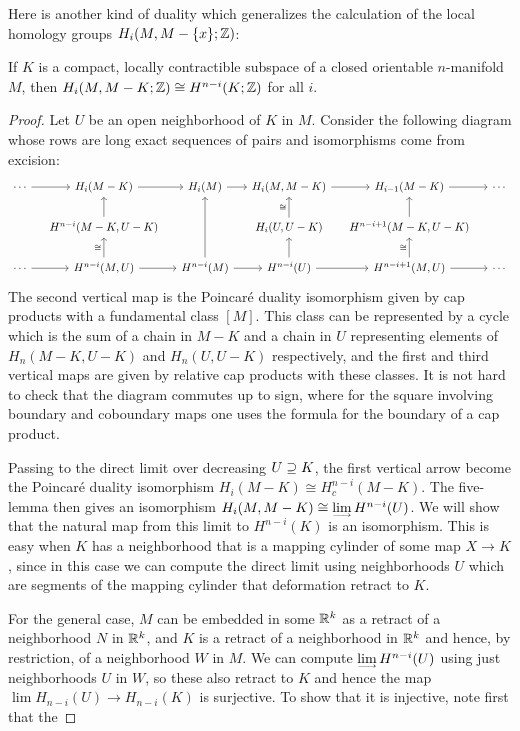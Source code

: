 Here is another kind of duality which generalizes the calculation of the local homology groups $H_i(M,M-\{x\};\mathbb{Z})$:
\begin{theorem}\label{loc contract dual}
If $K$ is a compact, locally contractible subspace of a closed orientable $n$-manifold $M$, then $H_i(M,M-K;\mathbb{Z})\cong H^{n-i}(K;\mathbb{Z})$ for all $i$.
\end{theorem}
\begin{proof}
Let $U$ be an open neighborhood of $K$ in $M$. Consider the following diagram whose rows are long exact sequences of pairs and isomorphisms come from excision:
\[\begin{tikzcd}[column sep=small]
\cdots\ar[r]&H_i(M-K)\ar[r]&H_i(M)\ar[r]&H_i(M,M-K)\ar[r]&H_{i-1}(M-K)\ar[r]&\cdots\\
&H^{n-i}(M-K,U-K)\ar[u]&&H_i(U,U-K)\ar[u,"\cong"]&H^{n-i+1}(M-K,U-K)\ar[u]&\\
\cdots\ar[r]&H^{n-i}(M,U)\ar[u,"\cong"]\ar[r]&H^{n-i}(M)\ar[uu]\ar[r]&H^{n-i}(U)\ar[r]\ar[u]&H^{n-i+1}(M,U)\ar[r]\ar[u,"\cong"]&\cdots
\end{tikzcd}\]
The second vertical map is the Poincar\'e duality isomorphism given by cap products with a fundamental class $[M]$. This class can be represented by a cycle which is the sum of a chain in $M-K$ and a chain in $U$ representing elements of $H_n(M-K,U-K)$ and $H_n(U,U-K)$ respectively, and the first and third vertical maps are given by relative cap products with these classes. It is not hard to check that the diagram commutes up to sign, where for the square involving boundary and coboundary maps one uses the formula for the boundary of a cap product.\par
Passing to the direct limit over decreasing $U\supseteq K$, the first vertical arrow become the Poincar\'e duality isomorphism $H_i(M-K)\cong H^{n-i}_c(M-K)$. The five-lemma then gives an isomorphism $H_i(M,M-K)\cong\rlim H^{n-i}(U)$. We will show that the natural
map from this limit to $H^{n-i}(K)$ is an isomorphism. This is easy when $K$ has a neighborhood that is a mapping cylinder of some map $X\to K$, since in this case we can compute the direct limit using neighborhoods $U$ which are segments of the mapping cylinder that deformation retract to $K$.\par
For the general case, $M$ can be embedded in some $\mathbb{R}^k$ as a retract of a neighborhood $N$ in $\mathbb{R}^k$, and $K$ is a retract of a neighborhood in $\mathbb{R}^k$
and hence, by restriction, of a neighborhood $W$ in $M$. We can compute $\rlim H^{n-i}(U)$ using just neighborhoods $U$ in $W$, so these also retract to $K$ and hence the map $\lim H_{n-i}(U)\to H_{n-i}(K)$ is surjective. To show that it is injective, note first that the

\end{proof}
